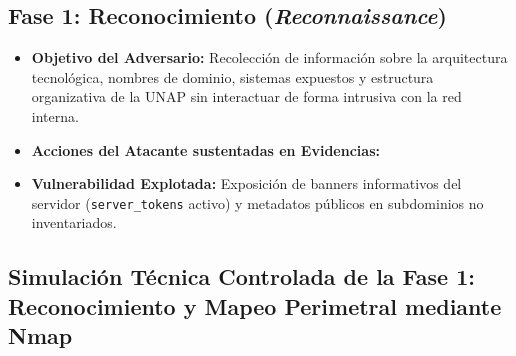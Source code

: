\subsection*{Fase 1: Reconocimiento (\textit{Reconnaissance})}
\begin{itemize}
    \item \textbf{Objetivo del Adversario:} Recolección de información sobre la arquitectura tecnológica, nombres de dominio, sistemas expuestos y estructura organizativa de la UNAP sin interactuar de forma intrusiva con la red interna.
    \item \textbf{Acciones del Atacante sustentadas en Evidencias:}
    \item \textbf{Vulnerabilidad Explotada:} Exposición de banners informativos del servidor (\texttt{server\_tokens} activo) y metadatos públicos en subdominios no inventariados.
\end{itemize}

\newpage
\subsection{Simulación Técnica Controlada de la Fase 1: Reconocimiento y Mapeo Perimetral mediante Nmap}\label{subsec:nmap_simulation}

